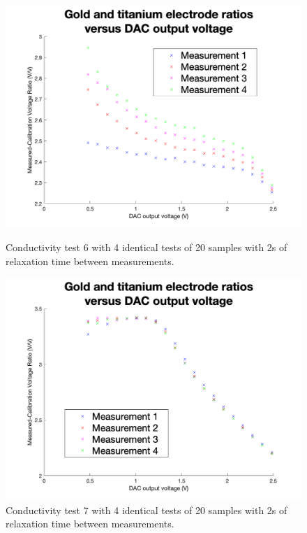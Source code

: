\begin{figure}[ht]
    \begin{minipage}{0.5\textwidth}
        \centering
        \includegraphics[width=\textwidth]{Figures/Testing/Aus17}
        \caption{Conductivity test 6 with 4 identical tests of 20 samples with 2s of relaxation time between measurements.}
        \label{fig:test11} %
    \end{minipage}
    \begin{minipage}{0.5\textwidth}
        \centering
        \includegraphics[width=\textwidth]{Figures/Testing/Ti17}
        \caption{Conductivity test 7 with 4 identical tests of 20 samples with 2s of relaxation time between measurements.}
        \label{fig:test12} %
    \end{minipage}
\end{figure}

